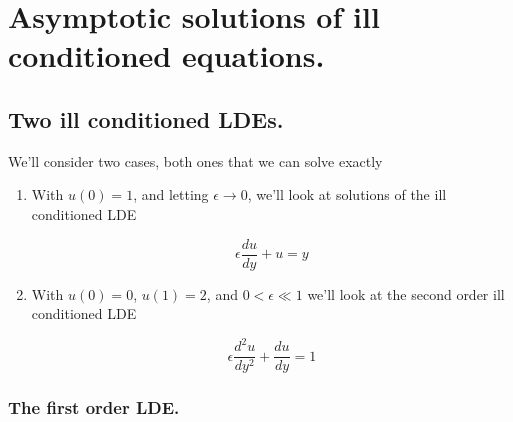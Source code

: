 %
%

\chapter{Asymptotic solutions of ill conditioned equations.}
\label{chap:continuumL20}
{}
\date{Mar 28, 2012}

\beginArtWithToc

%
%
\section{Two ill conditioned LDEs.}

We'll consider two cases, both ones that we can solve exactly

\begin{enumerate}
\item With $u(0) = 1$, and letting $\epsilon \rightarrow 0$, we'll look at solutions of the ill conditioned LDE

\begin{equation}\label{eqn:continuumL20:10}
\epsilon \frac{du}{dy} + u = y
\end{equation}

\item With $u(0) = 0$, $u(1) = 2$, and $0 < \epsilon \ll 1$ we'll look at the second order ill conditioned LDE

\begin{equation}\label{eqn:continuumL20:30}
\epsilon \frac{d^2u}{dy^2} + \frac{du}{dy} = 1
\end{equation}
\end{enumerate}

\subsection{The first order LDE.}
